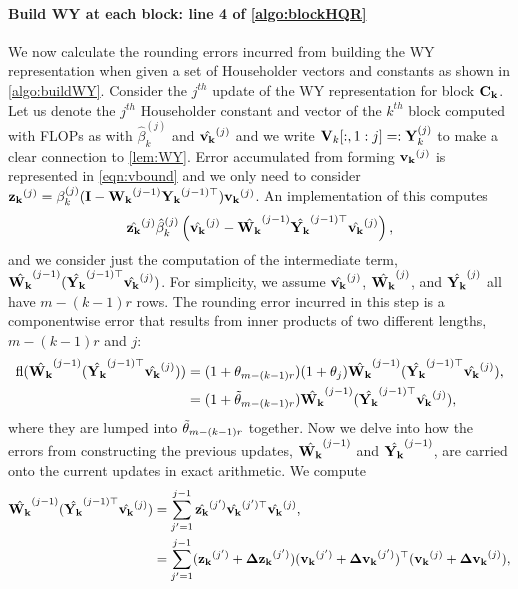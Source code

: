 \paragraph{Build WY at each block: line 4 of \cref{algo:blockHQR}}
We now calculate the rounding errors incurred from building the WY representation when given a set of Householder vectors and constants as shown in \cref{algo:buildWY}.
Consider the $j^{th}$ update of the WY representation for block $\mathbf{C_k}$.
Let us denote the $j^{th}$ Householder constant and vector of the $k^{th}$ block computed with FLOPs as with $\hat{\beta}_k^{(j)}$ and $\hat{\mathbf{v_k}}^{(j)}$ and we write $\mathbf{V}_k[:,1:j]=:\mathbf{Y}_k^{(j)}$ to make a clear connection to \cref{lem:WY}.
Error accumulated from forming $\mathbf{v_k}^{(j)}$ is represented in \cref{eqn:vbound} and we only need to consider $\mathbf{z_k}^{(j)} =\beta_k^{(j)}(\mathbf{I}-\mathbf{W_k}^{(j-1)}\mathbf{Y_k}^{(j-1)\top})\mathbf{v_k}^{(j)}$.
An implementation of this computes $$\hat{\mathbf{z_k}}^{(j)}\hat{\beta}_k^{(j)}\left(\hat{\mathbf{v_k}}^{(j)} - \hat{\mathbf{W_k}}^{(j-1)}\hat{\mathbf{Y_k}}^{(j-1)\top}\hat{\mathbf{v_k}}^{(j)}\right),$$
and we consider just the computation of the intermediate term, $\hat{\mathbf{W_k}}^{(j-1)}(\hat{\mathbf{Y_k}}^{(j-1)\top}\hat{\mathbf{v_k}}^{(j)})$.
For simplicity, we assume $\hat{\mathbf{v_k}}^{(j)}$, $\hat{\mathbf{W_k}}^{(j)}$, and $\hat{\mathbf{Y_k}}^{(j)}$ all have $m-(k-1)r$ rows. 
The rounding error incurred in this step is a componentwise error that results from inner products of two different lengths, $m-(k-1)r$ and $j$:
\begin{align}
	\fl(\hat{\bb{W_k}}^{(j-1)}(\hat{\bb{Y_k}}^{(j-1)\top}\hat{\bb{v_k}}^{(j)}))& = (1+\tth_{m-(k-1)r})(1+\tth_{j})\hat{\bb{W_k}}^{(j-1)}(\hat{\bb{Y_k}}^{(j-1)\top}\hat{\bb{v_k}}^{(j)}), \\ 
	&= (1+\tilde{\tth}_{m-(k-1)r})\hat{\bb{W_k}}^{(j-1)}(\hat{\bb{Y_k}}^{(j-1)\top}\hat{\bb{v_k}}^{(j)}),\label{eqn:FLOPwy}
\end{align}
where they are lumped into $\tilde{\theta}_{m-(k-1)r}$ together. 
Now we delve into how the errors from constructing the previous updates, $\hat{\mathbf{W_k}}^{(j-1)}$ and $\hat{\mathbf{Y_k}}^{(j-1)}$, are carried onto the current updates in exact arithmetic.
We compute
\begin{align*}
	\hat{\mathbf{W_k}}^{(j-1)}(\hat{\mathbf{Y_k}}^{(j-1)\top}\hat{\mathbf{v_k}}^{(j)}) &= \sum_{j'=1}^{j-1} \hat{\mathbf{z_k}}^{(j')}\hat{\mathbf{v_k}}^{(j')\top}\hat{\mathbf{v_k}}^{(j)}, \\
	&= \sum_{j'=1}^{j-1} (\mathbf{z_k}^{(j')} + \mathbf{\Delta z_k}^{(j')})(\mathbf{v_k}^{(j')} + \mathbf{\Delta v_k}^{(j')})^{\top}(\mathbf{v_k}^{(j)} + \mathbf{\Delta v_k}^{(j)}), 
\end{align*}
